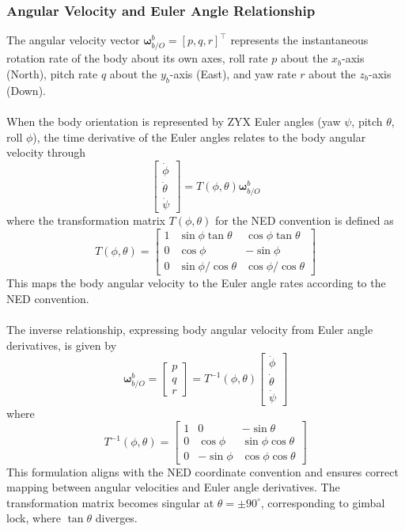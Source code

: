 \subsubsection{Angular Velocity and Euler Angle Relationship}
The angular velocity vector $\boldsymbol{\omega}_{b/O}^{b} = [p, q, r]^\top$ represents the instantaneous rotation rate of the body about its own axes, roll rate $p$ about the $x_b$-axis (North), pitch rate $q$ about the $y_b$-axis (East), and yaw rate $r$ about the $z_b$-axis (Down).  
\\ \\
When the body orientation is represented by ZYX Euler angles (yaw $\psi$, pitch $\theta$, roll $\phi$), the time derivative of the Euler angles relates to the body angular velocity through
$$
    \begin{bmatrix}
        \dot{\phi} \\ \dot{\theta} \\ \dot{\psi}
    \end{bmatrix}
    = T(\phi, \theta)\boldsymbol{\omega}_{b/O}^{b}
$$
where the transformation matrix $T(\phi, \theta)$ for the NED convention is defined as
$$
    T(\phi, \theta) =
    \begin{bmatrix}
        1 & \sin\phi\tan\theta & \cos\phi\tan\theta \\
        0 & \cos\phi & -\sin\phi \\
        0 & \sin\phi/\cos\theta & \cos\phi/\cos\theta
    \end{bmatrix}
$$
This maps the body angular velocity to the Euler angle rates according to the NED convention.  
\\ \\
The inverse relationship, expressing body angular velocity from Euler angle derivatives, is given by
$$
    \boldsymbol{\omega}_{b/O}^{b} =
    \begin{bmatrix}
        p \\ q \\ r
    \end{bmatrix}
    = T^{-1}(\phi, \theta)
    \begin{bmatrix}
        \dot{\phi} \\ \dot{\theta} \\ \dot{\psi}
    \end{bmatrix}
$$
where
$$
    T^{-1}(\phi, \theta) =
    \begin{bmatrix}
        1 & 0 & -\sin\theta \\
        0 & \cos\phi & \sin\phi\cos\theta \\
        0 & -\sin\phi & \cos\phi\cos\theta
    \end{bmatrix}
$$
This formulation aligns with the NED coordinate convention and ensures correct mapping between angular velocities and Euler angle derivatives. The transformation matrix becomes singular at $\theta = \pm 90^\circ$, corresponding to gimbal lock, where $\tan\theta$ diverges.  




